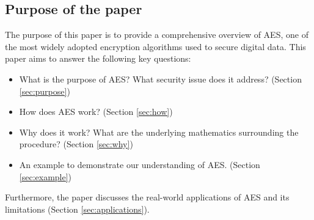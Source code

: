 \subsection{Purpose of the paper}

The purpose of this paper is to provide a comprehensive overview of \gls{AES}, one of the most widely adopted encryption algorithms used to secure digital data.
This paper aims to answer the following key questions:
\begin{itemize}
    \item What is the purpose of \gls{AES}? What security issue does it address? (Section \ref{sec:purpose})
    \item How does \gls{AES} work? (Section \ref{sec:how})
    \item Why does it work? What are the underlying mathematics surrounding the procedure?  (Section \ref{sec:why})
    \item An example to demonstrate our understanding of \gls{AES}. (Section \ref{sec:example})
\end{itemize}
Furthermore, the paper discusses the real-world applications of \gls{AES} and its limitations (Section \ref{sec:applications}). 

